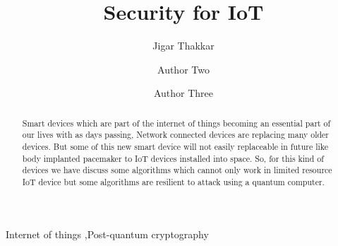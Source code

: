 \documentclass[preprint,10pt,5p]{elsarticle}
\begin{document}
\begin{frontmatter}

\title{Security for IoT}


 
\author[label1]{Jigar Thakkar}
\address[label1]{Master of IT,The University of Melbourne, Vic - 3010, Australia, thakkarj@student.unimelb.edu.au}
\address[label2]{Address Two}



\author[label5]{Author Two}
\address[label5]{Some University}

\author[label1,label5]{Author Three}

\begin{abstract}
Smart devices which are part of the internet of things becoming an essential part of our lives with as days passing, Network connected devices are replacing many older devices. But some of this new smart device will not easily replaceable in future like body implanted pacemaker to IoT devices installed into space. So, for this kind of devices we have discuss some algorithms which cannot only work in limited resource IoT device but some algorithms are resilient to attack using a quantum computer.

\end{abstract}

\begin{keyword}
Internet of things \sep Post-quantum cryptography 
\end{keyword}

\end{frontmatter}


\end{document}
